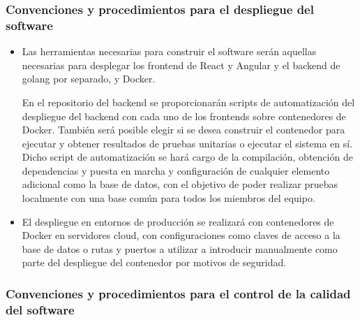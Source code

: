 \documentclass[12pt, a4paper, titlepage]{article}
\begin{document}
\subsubsection{Convenciones y procedimientos para el despliegue del software}

\begin{itemize}
    \item Las herramientas necesarias para construir el software serán aquellas necesarias para desplegar los frontend de React y Angular y el backend de golang por separado, y Docker.
    
    En el repositorio del backend se proporcionarán scripts de automatización del despliegue del backend con cada uno de los frontends sobre contenedores de Docker. También será posible elegir si se desea construir el contenedor para ejecutar y obtener resultados de pruebas unitarias o ejecutar el sistema en sí.\\
    
    Dicho script de automatización se hará cargo de la compilación, obtención de dependencias y puesta en marcha y configuración de cualquier elemento adicional como la base de datos, con el objetivo de poder realizar pruebas localmente con una base común para todos los miembros del equipo.
    
    \item El despliegue en entornos de producción se realizará con contenedores de Docker en servidores cloud, con configuraciones como claves de acceso a la base de datos o rutas y puertos a utilizar a introducir manualmente como parte del despliegue del contenedor por motivos de seguridad.
\end{itemize}

\subsubsection{Convenciones y procedimientos para el control de la calidad del software}
\end{document}
